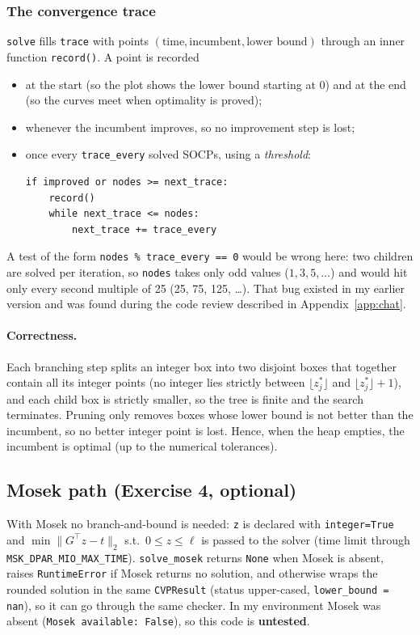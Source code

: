 \documentclass[11pt,a4paper]{article}
\newcommand{\norm}[1]{\lVert #1\rVert_2}
\begin{document}
\subsubsection{The convergence trace}\label{sec:trace}

\texttt{solve} fills \texttt{trace} with points $(\text{time},\text{incumbent},\text{lower bound})$ through an inner function \texttt{record()}. A point is recorded
\begin{itemize}
  \item at the start (so the plot shows the lower bound starting at $0$) and at the end (so the curves meet when optimality is proved);
  \item whenever the incumbent improves, so no improvement step is lost;
  \item once every \texttt{trace\_every} solved SOCPs, using a \emph{threshold}:
\begin{lstlisting}
if improved or nodes >= next_trace:
    record()
    while next_trace <= nodes:
        next_trace += trace_every
\end{lstlisting}
\end{itemize}
A test of the form \texttt{nodes \% trace\_every == 0} would be wrong here: two children are solved per iteration, so \texttt{nodes} takes only odd values ($1,3,5,\dots$) and would hit only every second multiple of 25 (25, 75, 125, \dots). That bug existed in my earlier version and was found during the code review described in Appendix~\ref{app:chat}.

\paragraph{Correctness.} Each branching step splits an integer box into two disjoint boxes that together contain all its integer points (no integer lies strictly between $\lfloor z_j^\ast\rfloor$ and $\lfloor z_j^\ast\rfloor+1$), and each child box is strictly smaller, so the tree is finite and the search terminates. Pruning only removes boxes whose lower bound is not better than the incumbent, so no better integer point is lost. Hence, when the heap empties, the incumbent is optimal (up to the numerical tolerances).

\subsection{Mosek path (Exercise 4, optional)}

With Mosek no branch-and-bound is needed: \texttt{z} is declared with \texttt{integer=True} and $\min \norm{G^\top z-t}$ s.t.\ $0\le z\le\ell$ is passed to the solver (time limit through \texttt{MSK\_DPAR\_MIO\_MAX\_TIME}). \texttt{solve\_mosek} returns \texttt{None} when Mosek is absent, raises \texttt{RuntimeError} if Mosek returns no solution, and otherwise wraps the rounded solution in the same \texttt{CVPResult} (status upper-cased, \texttt{lower\_bound = nan}), so it can go through the same checker. In my environment Mosek was absent (\texttt{Mosek available: False}), so this code is \textbf{untested}.
\end{document}
